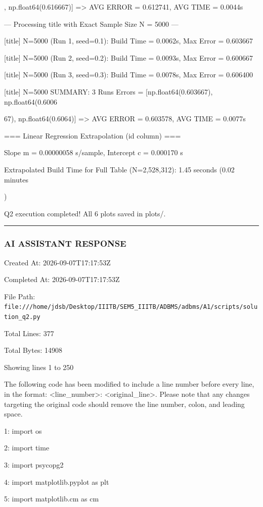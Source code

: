 \documentclass[11pt,a4paper]{article}
\begin{document}
, np.float64(0.616667)] => AVG ERROR = 0.612741, AVG TIME = 0.0044s

--- Processing title with Exact Sample Size N = 5000 ---

[title] N=5000 (Run 1, seed=0.1): Build Time = 0.0062s, Max Error = 0.603667

[title] N=5000 (Run 2, seed=0.2): Build Time = 0.0093s, Max Error = 0.600667

[title] N=5000 (Run 3, seed=0.3): Build Time = 0.0078s, Max Error = 0.606400

[title] N=5000 SUMMARY: 3 Runs Errors = [np.float64(0.603667), np.float64(0.6006

67), np.float64(0.6064)] => AVG ERROR = 0.603578, AVG TIME = 0.0077s

=== Linear Regression Extrapolation (id column) ===

Slope m = 0.00000058 s/sample, Intercept c = 0.000170 s

Extrapolated Build Time for Full Table (N=2,528,312): 1.45 seconds (0.02 minutes

)

Q2 execution completed! All 6 plots saved in plots/.


\hrule

\subsubsection{AI ASSISTANT RESPONSE}

Created At: 2026-09-07T17:17:53Z

Completed At: 2026-09-07T17:17:53Z

File Path: \texttt{file:///home/jdsb/Desktop/IIITB/SEM5\_IIITB/ADBMS/adbms/A1/scripts/solution\_q2.py}

Total Lines: 377

Total Bytes: 14908

Showing lines 1 to 250

The following code has been modified to include a line number before every line, in the format: <line\_number>: <original\_line>. Please note that any changes targeting the original code should remove the line number, colon, and leading space.

1: import os

2: import time

3: import psycopg2

4: import matplotlib.pyplot as plt

5: import matplotlib.cm as cm
\end{document}
